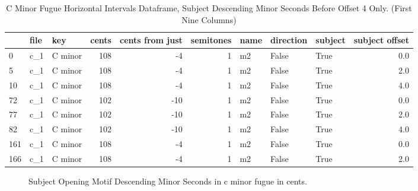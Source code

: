 \begin{singlespace}
\begin{table}[H]
\centering
\tiny
\begin{tabular}{|lllrrrlllr|}
\hline
\textbf{{}} & \textbf{file} & \textbf{     key} & \textbf{ cents} & \textbf{ cents from just} & \textbf{ semitones} & \textbf{name} & \textbf{direction} & \textbf{subject} & \textbf{ subject offset }\\
\hline
0   &  c\_1 &  C minor &    108 &               -4 &          1 &   m2 &     False &    True &             0.0 \\
5   &  c\_1 &  C minor &    108 &               -4 &          1 &   m2 &     False &    True &             2.0 \\
10  &  c\_1 &  C minor &    108 &               -4 &          1 &   m2 &     False &    True &             4.0 \\
72  &  c\_1 &  C minor &    102 &              -10 &          1 &   m2 &     False &    True &             0.0 \\
77  &  c\_1 &  C minor &    102 &              -10 &          1 &   m2 &     False &    True &             2.0 \\
82  &  c\_1 &  C minor &    102 &              -10 &          1 &   m2 &     False &    True &             4.0 \\
161 &  c\_1 &  C minor &    108 &               -4 &          1 &   m2 &     False &    True &             0.0 \\
166 &  c\_1 &  C minor &    108 &               -4 &          1 &   m2 &     False &    True &             2.0 \\
\hline
\end{tabular}
\caption[C minor Fugue Horizontal Intervals Dataframe, Subject Descending Minor Seconds Before Offset 4 Only. ]{C Minor Fugue Horizontal Intervals Dataframe, Subject Descending Minor Seconds Before Offset 4 Only. (First Nine Columns)}
\end{table}
\normalsize
\end{singlespace}





\begin{figure}[H]
    \begin{center}
    \caption{ Subject Opening Motif Descending Minor Seconds in c minor fugue in cents. }
    \end{center}
\end{figure}
    
